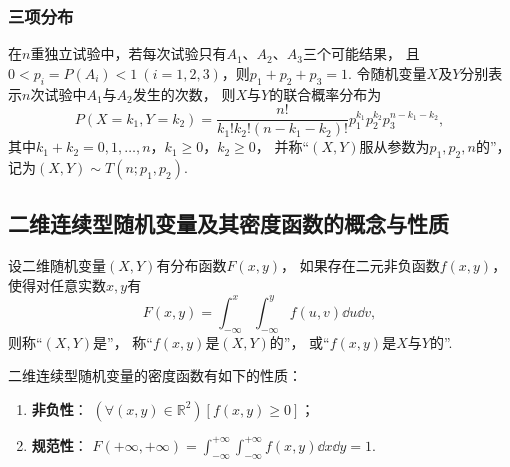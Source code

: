 \subsubsection{三项分布}
\begin{definition}
在\(n\)重独立试验中，若每次试验只有\(A_1\)、\(A_2\)、\(A_3\)三个可能结果，
且\(0 < p_i = P(A_i) < 1\ (i=1,2,3)\)，则\(p_1 + p_2 + p_3 = 1\).
令随机变量\(X\)及\(Y\)分别表示\(n\)次试验中\(A_1\)与\(A_2\)发生的次数，
则\(X\)与\(Y\)的联合概率分布为\[
	P(X=k_1,Y=k_2)
	= \frac{n!}{k_1! k_2! (n-k_1-k_2)!} p_1^{k_1} p_2^{k_2} p_3^{n-k_1-k_2},
\]
其中\(k_1+k_2 = 0,1,\dotsc,n\)，\(k_1 \geq 0\)，\(k_2 \geq 0\)，
并称“\((X,Y)\)服从参数为\(p _1,p_2,n\)的”，
记为\((X,Y) \sim T(n;p_1,p_2)\).
\end{definition}

\subsection{二维连续型随机变量及其密度函数的概念与性质}
\begin{definition}
设二维随机变量\((X,Y)\)有分布函数\(F(x,y)\)，
如果存在二元非负函数\(f(x,y)\)，
使得对任意实数\(x,y\)有\[
	F(x,y) = \int_{-\infty}^x \int_{-\infty}^y f(u,v) \dd{u} \dd{v},
\]
则称“\((X,Y)\)是”，
称“\(f(x,y)\)是\((X,Y)\)的”，
或“\(f(x,y)\)是\(X\)与\(Y\)的”.
\end{definition}

\begin{property}
二维连续型随机变量的密度函数有如下的性质：
\begin{enumerate}
	\item {\rm\bf 非负性}：
	\((\forall (x,y)\in\mathbb{R}^2)[f(x,y) \geq 0]\)；

	\item {\rm\bf 规范性}：
	\(F(+\infty,+\infty)
	= \int_{-\infty}^{+\infty} \int_{-\infty}^{+\infty} f(x,y) \dd{x} \dd{y} = 1\).
\end{enumerate}
\end{property}

